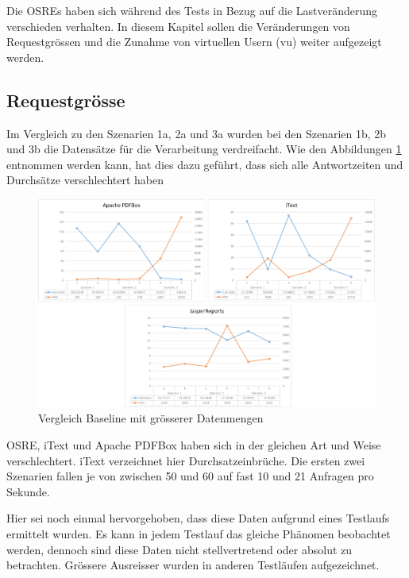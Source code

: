 \documentclass[main.tex]{subfiles}
\begin{document}
Die OSREs haben sich während des Tests in Bezug auf die Lastveränderung verschieden verhalten. In diesem Kapitel sollen die Veränderungen von Requestgrössen und die Zunahme von virtuellen Usern (\acrshort{vu}) weiter aufgezeigt werden.


\subsection{Requestgrösse}

Im Vergleich zu den Szenarien 1a, 2a und 3a wurden bei den Szenarien 1b, 2b und 3b die Datensätze für die Verarbeitung verdreifacht. Wie den Abbildungen \ref{figure:vglABRequ} entnommen werden kann, hat dies dazu geführt, dass sich alle Antwortzeiten und Durchsätze verschlechtert haben

\begin{figure}[!hb]
\includegraphics[width=\textwidth]{mainpart/4_analyse_img/ABAuswertung.png}
 \caption{Vergleich Baseline mit grösserer Datenmengen}
 \label{figure:vglABRequ}
\end{figure}

OSRE, iText und Apache PDFBox haben sich in der gleichen Art und Weise verschlechtert. iText verzeichnet hier Durchsatzeinbrüche. Die ersten zwei Szenarien fallen je von zwischen 50 und 60 auf fast 10 und 21 Anfragen pro Sekunde.

Hier sei noch einmal hervorgehoben, dass diese Daten aufgrund eines Testlaufs ermittelt wurden. Es kann in jedem Testlauf das gleiche Phänomen beobachtet werden, dennoch sind diese Daten nicht stellvertretend oder absolut zu betrachten. Grössere Ausreisser wurden in anderen Testläufen aufgezeichnet.
\end{document}
